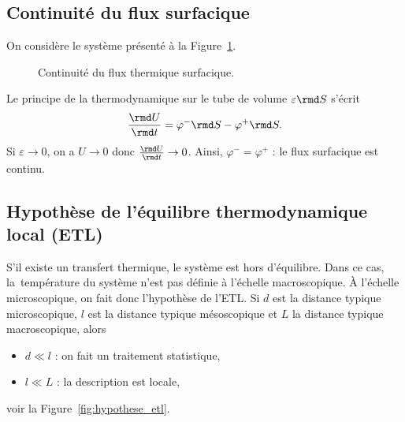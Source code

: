     \subsection{Continuité du flux surfacique}

        On considère le système présenté à la Figure~\ref{fig:continuite_flux_surfacique}.

        \begin{figure}
            \centering
            \caption{Continuité du flux thermique surfacique.}    
            \label{fig:continuite_flux_surfacique}
        \end{figure}

        Le principe de la thermodynamique sur le tube de volume $\varepsilon\rmd S$ s'écrit
        \begin{equation*}
            \frac{\rmd U}{\rmd t}=\varphi^{-}\rmd S-\varphi^{+}\rmd S.
        \end{equation*}
        Si $\varepsilon\to0$, on a $U\to0$ donc $\frac{\rmd U}{\rmd t}\to0$. Ainsi, $\varphi^{-}=\varphi^{+}$ : le flux surfacique est continu.

    \subsection{Hypothèse de l'équilibre thermodynamique local (ETL)}

        S'il existe un transfert thermique, le système est hors d'équilibre. Dans ce cas, \og la\fg~température du système n'est pas définie à l'échelle macroscopique.
        À l'échelle microscopique, on fait donc l'hypothèse de l'ETL. Si $d$ est la distance typique microscopique, $l$ est la distance typique mésoscopique et $L$ la distance typique macroscopique, alors
        \begin{itemize}
            \item $d\ll l$ : on fait un traitement statistique,
            \item $l\ll L$ : la description est locale,
        \end{itemize}
        voir la Figure~\ref{fig:hypothese_etl}.


